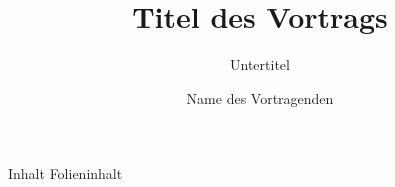\documentclass[smaller]{beamer}
\author[Name]{Name des Vortragenden}
\title[Kurztitel]{Titel des Vortrags}
\subtitle{Untertitel}
\institute[Fachgruppe o.\"a.]{Organisationseinheit}
\begin{document}
\maketitle

\begin{frame}{Inhalt}
Folieninhalt
\end{frame}
\end{document}
